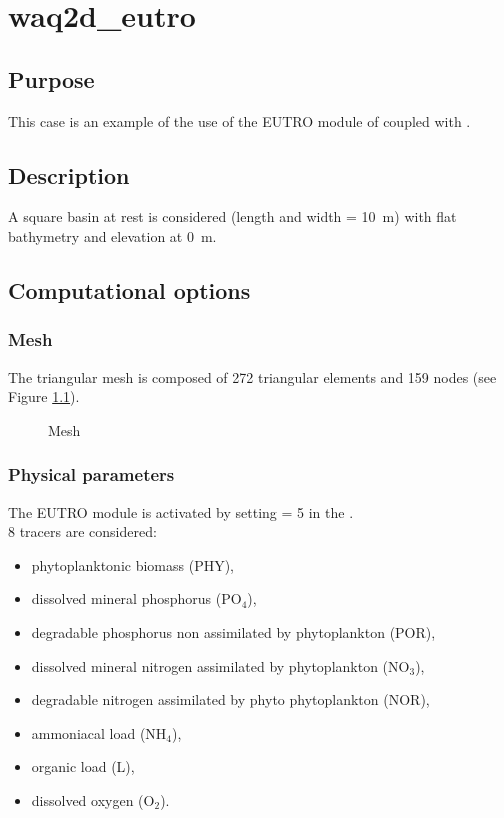 \chapter{waq2d\_eutro}

\section{Purpose}

This case is an example of the use of the EUTRO module of \waqtel coupled with
.

\section{Description}

A square basin at rest is considered (length and width = 10~m)
with flat bathymetry and elevation at 0~m.

\section{Computational options}

\subsection{Mesh}

The triangular mesh is composed of 272 triangular elements and 159 nodes
(see Figure \ref{fig:waq2d_eutro:mesh}).

\begin{figure}[H]
 \centering
\caption{Mesh}
 \label{fig:waq2d_eutro:mesh}
\end{figure}

\subsection{Physical parameters}

The EUTRO module is activated by setting  = 5
in the  .\\

8 tracers are considered:
\begin{itemize}
\item phytoplanktonic biomass (PHY),
\item dissolved mineral phosphorus (PO$_4$),
\item degradable phosphorus non assimilated by phytoplankton (POR),
\item dissolved mineral nitrogen assimilated by phytoplankton (NO$_3$),
\item degradable nitrogen assimilated by phyto phytoplankton (NOR),
\item ammoniacal load (NH$_4$),
\item organic load (L),
\item dissolved oxygen (O$_2$).
\end{itemize}


